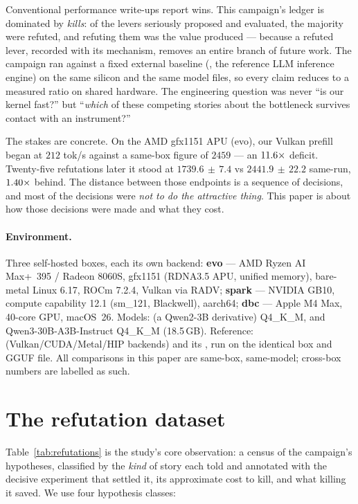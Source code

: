\documentclass[11pt]{article}
\begin{document}
Conventional performance write-ups report wins. This campaign's ledger is dominated by \emph{kills}: of the
levers seriously proposed and evaluated, the majority were refuted, and refuting them was the value
produced --- because a refuted lever, recorded with its mechanism, removes an entire branch of future work.
The campaign ran against a fixed external baseline (, the reference LLM inference engine)
on the same silicon and the same model files, so every claim reduces to a measured ratio on shared
hardware. The engineering question was never ``is our kernel fast?'' but ``\emph{which} of these competing
stories about the bottleneck survives contact with an instrument?''

The stakes are concrete. On the AMD gfx1151 APU (evo), our Vulkan prefill began at $212$ tok/s against a
same-box  figure of $2459$ --- an $11.6\times$ deficit. Twenty-five refutations later it stood
at $1739.6\,{\pm}\,7.4$ vs $2441.9\,{\pm}\,22.2$ same-run, $1.40\times$ behind. The distance between those endpoints is a
sequence of decisions, and most of the decisions were \emph{not to do the attractive thing}. This paper is
about how those decisions were made and what they cost.

\paragraph{Environment.} Three self-hosted boxes, each its own backend: \textbf{evo} --- AMD Ryzen AI
Max+~395 / Radeon 8060S, gfx1151 (RDNA3.5 APU, unified memory), bare-metal Linux 6.17, ROCm 7.2.4, Vulkan
via RADV; \textbf{spark} --- NVIDIA GB10, compute capability 12.1 (sm\_121, Blackwell), aarch64;
\textbf{dbc} --- Apple M4 Max, 40-core GPU, macOS~26. Models:  (a Qwen2-3B derivative)
Q4\_K\_M, and Qwen3-30B-A3B-Instruct Q4\_K\_M (18.5\,GB). Reference:  (Vulkan/CUDA/Metal/HIP
backends) and its , run on the identical box and GGUF file. All comparisons in this paper
are same-box, same-model; cross-box numbers are labelled as such.

\section{The refutation dataset}
\label{sec:dataset}

Table~\ref{tab:refutations} is the study's core observation: a census of the campaign's hypotheses,
classified by the \emph{kind} of story each told and annotated with the decisive experiment that settled
it, its approximate cost to kill, and what killing it saved. We use four hypothesis classes:
\end{document}
